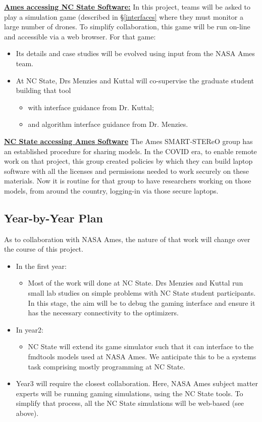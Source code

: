 \documentclass[twoside]{NSF}
\newenvironment{myitemize}
{ \begin{itemize}[topsep=0pt,itemsep=0pt,leftmargin=*]
    \setlength{\itemsep}{0pt}
    \setlength{\parskip}{0pt}
    \setlength{\parsep}{0pt}     }
{ \end{itemize}                  }
\newcommand{\bi}{\begin{myitemize}}
\newcommand{\ei}{\end{myitemize}}
\begin{document}
\underline{\bf Ames accessing NC State Software:}
In this project,  teams will be asked to
play a simulation game  (described in \S\ref{interfaces} where they must 
monitor a large number of drones. 
To simplify collaboration, this game will be run on-line and accessible via a web browser. 
For that game:  
\bi 
\item Its details and case studies will be evolved using input from the NASA Ames team.
\item At NC State, Drs Menzies and Kuttal will co-supervise the graduate student building that tool 
\bi 
\item with interface guidance from Dr. Kuttal;
\item and algorithm interface guidance from Dr. Menzies.
\ei
\ei
\underline{\bf NC State accessing Ames Software}
The Ames SMART-STEReO group has an established procedure for sharing models.   In the COVID era, to enable remote work on that project,
this group created policies by which they can build laptop software with all the licenses and permissions needed to work securely on these materials. Now it is routine for that group
 to have researchers  working on those models, from around the country, logging-in via those secure laptops.

\subsection*{Year-by-Year Plan}


As to collaboration with NASA Ames, the nature of that work will change over the course of   this project. 
\bi 
\item In the first year:
\bi 
\item 
Most of the work will done at   NC State.  Drs Menzies and Kuttal run small lab studies on simple problems with NC State student participants. In this stage,
the aim will be to debug the gaming interface and ensure it has the necessary connectivity to the optimizers.
\ei
\item In year2:
\bi 
\item NC State will extend its game simulator such that it can interface to the fmdtools models used at NASA Ames. We anticipate this to be a systems task comprising mostly programming at NC State.
\ei

\item 
Year3 will require the closest collaboration. Here,
NASA Ames subject matter experts will be running gaming
simulations, using the NC State tools.  To simplify
that process, all the NC State simulations will be web-based
(see above).
\ei
\end{document}
